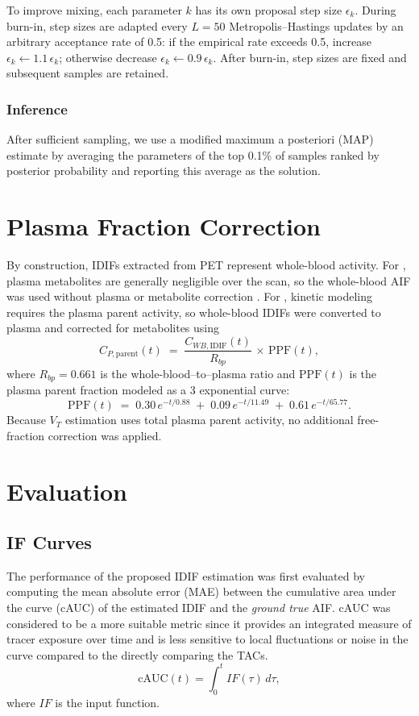 To improve mixing, each parameter \(k\) has its own proposal step size \(\epsilon_k\).
During burn-in, step sizes are adapted every \(L=50\) Metropolis–Hastings updates by an arbitrary acceptance rate of 0.5: if the empirical rate exceeds 0.5, increase \(\epsilon_k \leftarrow 1.1\,\epsilon_k\); otherwise decrease \(\epsilon_k \leftarrow 0.9\,\epsilon_k\).
After burn-in, step sizes are fixed and subsequent samples are retained.

\subsubsection{Inference}
After sufficient sampling, we use a modified maximum a posteriori (MAP) estimate by averaging the parameters of the top 0.1\% of samples ranked by posterior probability and reporting this average as the solution.
\section{Plasma Fraction Correction}
By construction, IDIFs extracted from PET represent whole-blood activity.
For \fdg, plasma metabolites are generally negligible over the scan, so the whole-blood AIF was used without plasma or metabolite correction \cite{TODO}.
For \yohimbine, kinetic modeling requires the plasma parent activity, so whole-blood IDIFs were converted to plasma and corrected for metabolites using
\begin{equation}
	C_{P,\mathrm{parent}}(t) \;=\; \frac{C_{WB,\mathrm{IDIF}}(t)}{R_{bp}} \,\times\, \mathrm{PPF}(t),
\end{equation}
where \(R_{bp}=0.661\) is the whole-blood–to–plasma ratio and \(\mathrm{PPF}(t)\) is the plasma parent fraction modeled as a 3 exponential curve:  \cite{TODO}
\begin{equation}
	\mathrm{PPF}(t) \;=\; 0.30\,e^{-t/0.88} \;+\; 0.09\,e^{-t/11.49} \;+\; 0.61\,e^{-t/65.77}.
\end{equation}
Because \(V_T\) estimation uses total plasma parent activity, no additional free-fraction correction was applied.

\section{Evaluation}

\subsection{IF Curves}
The performance of the proposed IDIF estimation was first evaluated by computing the mean absolute error (MAE) between the cumulative area under the curve (cAUC) of the estimated IDIF and the \textit{ground true} AIF. cAUC was considered to be a more suitable metric since it provides an integrated measure of tracer exposure over time and is less sensitive to local fluctuations or noise in the curve compared to the directly comparing the TACs.
\begin{equation}
	\textrm{cAUC}(t) =  \int_{0}^{t} IF(\tau) \, d\tau,
\end{equation}
where \(IF\) is the input function.

